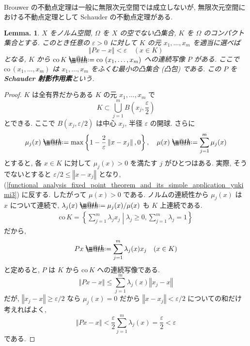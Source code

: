 \documentclass[openany, a4paper, oneside]{jsbook}
\makeatletter
\newcommand*{\defeq}{\mathrel{\rlap{%
\raisebox{0.3ex}{$\m@th\cdot$}}%
\raisebox{-0.3ex}{$\m@th\cdot$}}%
=}
\newcommand{\co}{\mathrm{co}\,}
\theoremstyle{break}
\newtheorem{lem}[thm]{Lemma.}
\theoremstyle{breakdefn}
\newcommand{\norm}[1]{\left\Vert#1\right\Vert}
\newcommand{\rbk}[1]{\left (#1\right)}
\newcommand{\cbk}[1]{\left\{#1\right\}}
\newcommand{\relmiddle}[1]{\mathrel{}\middle#1\mathrel{}}
\newcommand{\set}[2]{\left\{#1 \relmiddle| #2\right\}}
\makeatother
\begin{document}
Brouwer の不動点定理は一般に無限次元空間では成立しないが,
無限次元空間における不動点定理として Schauder の不動点定理がある.
\begin{lem}
 $X$ をノルム空間, $\Omega$ を $X$ の空でない凸集合,
 $K$ を $\Omega$ のコンパクト集合とする.
 このとき任意の $\varepsilon > 0$ に対して $K$ の元 $x_1, \dots , x_m$ を適当に選べば
 \begin{equation}
  \norm{Px - x}
  <
  \varepsilon \quad \rbk{x \in K}
 \end{equation}
 となる, $K$ から $\co K \defeq \co \rbk{x_1, \dots , x_m}$ への連続写像 $P$ がある.
 ここで $\co \rbk{x_1, \dots , x_m}$ は
 $x_1, \dots , x_m$ をふくむ最小の凸集合 (凸包) である.
 この $P$ を\textbf{Schauder 射影作用素}という.
\end{lem}
\begin{proof}
$K$ は全有界だからある $K$ の元 $x_1, \dots , x_m$ で
\begin{equation}\label{functional_analysis_fixed_point_theorem_and_its_simple_application_yukimi3}
 K
 \subset
 \bigcup_{j=1}^m B \rbk{x_j, \frac{\varepsilon}{2}}
\end{equation}
とできる.
ここで $B (x_j, \varepsilon / 2)$ は中心 $x_j$, 半径 $\varepsilon$ の開球.
さらに
\begin{equation}
 \mu_j(x)
 \defeq
 \max \cbk{1 - \frac{2}{\varepsilon} \norm{x - x_j}, 0}, \quad
 \mu (x)
 \defeq
 \sum_{j=1}^m \mu_j (x)
\end{equation}
とすると, 各 $x \in K$ に対して $\mu_j (x) > 0$ を満たす $j$ がひとつはある.
実際, そうでないとすると $\varepsilon / 2 \le \norm{x - x_j}$ となり,
(\ref{functional_analysis_fixed_point_theorem_and_its_simple_application_yukimi3}) に反する.
したがって $\mu (x) > 0$ である.
ノルムの連続性から $\mu_j (x)$ は $x$ について連続で,
$\lambda_j (x) \defeq \mu_j (x) / {\mu (x)}$ も $K$ 上連続である.
\begin{align}
 \co K
 =
 \set{\sum_{j=1}^m \lambda_j x_j}{\lambda_j \ge 0, \sum_{j=1}^m \lambda_j = 1}
\end{align}
だから,
\begin{equation}
 Px
 \defeq
 \sum_{j=1}^m \lambda_j (x) x_j \quad (x \in K)
\end{equation}
と定めると, $P$ は $K$ から $\co K$ への連続写像である.
\begin{equation}
 \norm{Px - x}
 \le
 \sum_{j=1}^m \lambda_j (x) \norm{x_j - x}
\end{equation}
だが,  $\norm{x_j - x} \ge \varepsilon / 2$ なら $\mu_j (x) = 0$ だから $\norm{x - x_j} < \varepsilon / 2$ についての和だけ考えればよく,
\begin{equation}
 \norm{Px - x}
 <
 \frac{\varepsilon}{2} \sum_{j=1}^m \lambda_j (x)
 =
 \frac{\varepsilon} {2}
 < \varepsilon
\end{equation}
である.
\end{proof}
\end{document}
